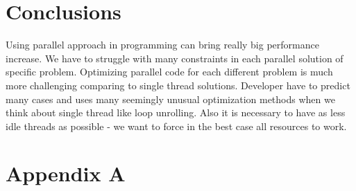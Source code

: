 \documentclass{scrreprt}
\begin{document}
\chapter{Conclusions}

Using parallel approach in programming can bring really big performance increase. We have to struggle with many constraints in each parallel solution of specific problem. Optimizing parallel code for each different problem is much more challenging comparing to single thread solutions. Developer have to predict many cases and uses many seemingly unusual optimization methods when we think about single thread like loop unrolling. Also it is necessary to have as less idle threads as possible - we want to force in the best case all resources to work.

\chapter{Appendix A}
\end{document}
